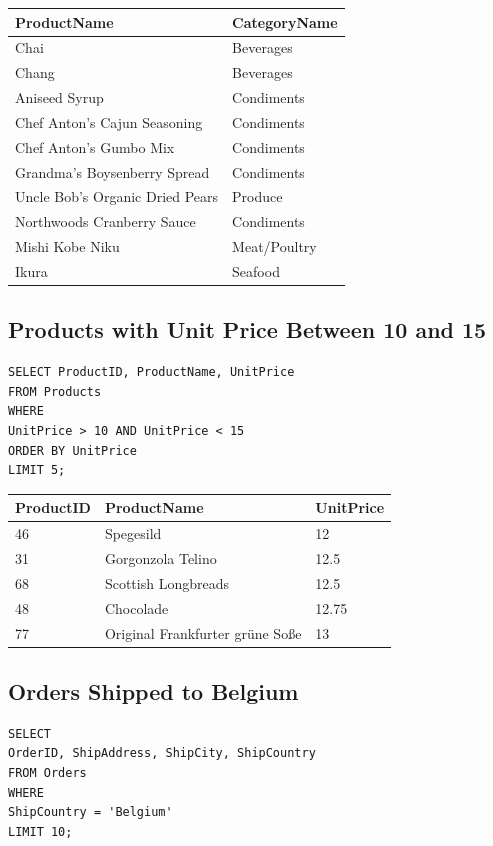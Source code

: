 \documentclass[10pt]{article}
\begin{document}
\begin{table}[H]
\begin{tabular}{|l|l|}
\hline
ProductName	& CategoryName \\
\hline
Chai	& Beverages \\
Chang	& Beverages \\
Aniseed Syrup	& Condiments \\
Chef Anton's Cajun Seasoning	& Condiments \\
Chef Anton's Gumbo Mix	& Condiments \\
Grandma's Boysenberry Spread	& Condiments \\
Uncle Bob's Organic Dried Pears	& Produce \\
Northwoods Cranberry Sauce	& Condiments \\
Mishi Kobe Niku	& Meat/Poultry \\
Ikura	& Seafood \\
\hline
\end{tabular}
\end{table}

\subsection{Products with Unit Price Between 10 and 15}
\begin{verbatim}
SELECT ProductID, ProductName, UnitPrice 
FROM Products 
WHERE 
UnitPrice > 10 AND UnitPrice < 15
ORDER BY UnitPrice
LIMIT 5;
\end{verbatim}

\begin{table}[H]
\begin{tabular}{|l|l|l|}
\hline
ProductID	& ProductName	& UnitPrice \\
\hline
46	& Spegesild	& 12 \\
31	& Gorgonzola Telino	& 12.5 \\
68	& Scottish Longbreads	& 12.5 \\
48	& Chocolade	& 12.75 \\
77	& Original Frankfurter grüne Soße	& 13 \\
\hline
\end{tabular}
\end{table}


\subsection{Orders Shipped to Belgium}
\begin{verbatim}
SELECT 
OrderID, ShipAddress, ShipCity, ShipCountry 
FROM Orders 
WHERE 
ShipCountry = 'Belgium'
LIMIT 10;
\end{verbatim}
\end{document}
